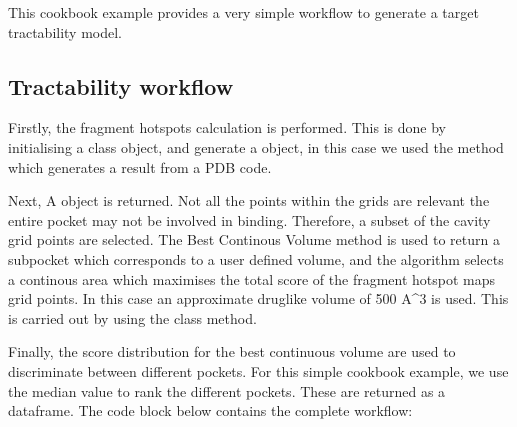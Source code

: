 \documentclass[letterpaper,10pt,english]{sphinxmanual}
\begin{document}
This cookbook example provides a very simple workflow to generate a target tractability model.


\subsection{Tractability workflow}
\label{\detokenize{tutorial:tractability-workflow}}
Firstly, the fragment hotspots calculation is performed. This is done by initialising a 
class object, and generate a  object, in this case we used the
 method which generates a result from a PDB code.

Next, A  object is returned. Not all the points within the grids
are relevant \sphinxhyphen{} the entire pocket may not be involved in binding. Therefore, a subset of the cavity grid points are
selected. The Best Continous Volume method is used to return a sub\sphinxhyphen{}pocket which corresponds to a user defined volume,
and the algorithm selects a continous area which maximises the total score of the fragment hotspot maps grid points. In
this case an approximate drug\sphinxhyphen{}like volume of 500 A\textasciicircum{}3 is used. This is carried out by using the
 class method.

Finally, the score distribution for the best continuous volume are used to discriminate between different pockets. For
this simple cookbook example, we use the median value to rank the different pockets. These are returned as a dataframe.
The code block below contains the complete workflow:
\end{document}
